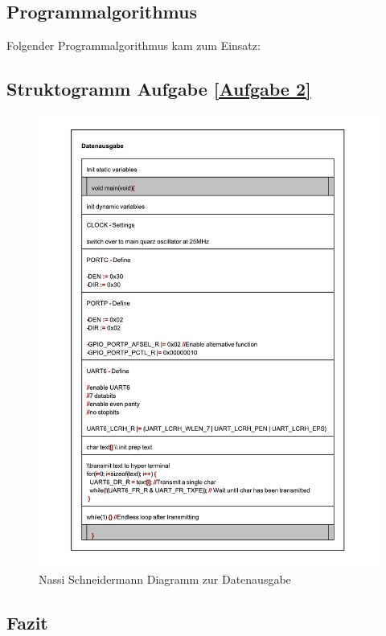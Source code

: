 	\subsection{Programmalgorithmus}
	Folgender Programmalgorithmus kam zum Einsatz:
	
		

	\subsection{Struktogramm Aufgabe \ref{Aufgabe 2}}

	\begin{figure}[H]
		\centering
		\includegraphics[width=0.9\linewidth]{../nassischneider/Datenausgabe_pdf}
		\caption{Nassi Schneidermann Diagramm zur Datenausgabe}
		\label{fig:datenausgabepdf}
	\end{figure}

\newpage
	\subsection{Fazit}
	

